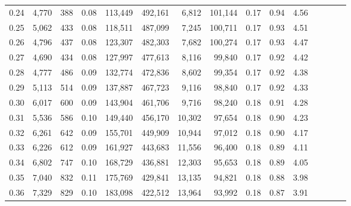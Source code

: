 \begin{tabular}{rrrcrrrrrrrrrrr}
0.24 &   4,770 &    388 &                                       0.08 &  113,449 &  492,161 &    6,812 &  101,144 &  0.17 &  0.94 &                         4.56 \\
0.25 &   5,062 &    433 &                                       0.08 &  118,511 &  487,099 &    7,245 &  100,711 &  0.17 &  0.93 &                         4.51 \\
0.26 &   4,796 &    437 &                                       0.08 &  123,307 &  482,303 &    7,682 &  100,274 &  0.17 &  0.93 &                         4.47 \\
0.27 &   4,690 &    434 &                                       0.08 &  127,997 &  477,613 &    8,116 &   99,840 &  0.17 &  0.92 &                         4.42 \\
0.28 &   4,777 &    486 &                                       0.09 &  132,774 &  472,836 &    8,602 &   99,354 &  0.17 &  0.92 &                         4.38 \\
0.29 &   5,113 &    514 &                                       0.09 &  137,887 &  467,723 &    9,116 &   98,840 &  0.17 &  0.92 &                         4.33 \\
0.30 &   6,017 &    600 &                                       0.09 &  143,904 &  461,706 &    9,716 &   98,240 &  0.18 &  0.91 &                         4.28 \\
0.31 &   5,536 &    586 &                                       0.10 &  149,440 &  456,170 &   10,302 &   97,654 &  0.18 &  0.90 &                         4.23 \\
0.32 &   6,261 &    642 &                                       0.09 &  155,701 &  449,909 &   10,944 &   97,012 &  0.18 &  0.90 &                         4.17 \\
0.33 &   6,226 &    612 &                                       0.09 &  161,927 &  443,683 &   11,556 &   96,400 &  0.18 &  0.89 &                         4.11 \\
0.34 &   6,802 &    747 &                                       0.10 &  168,729 &  436,881 &   12,303 &   95,653 &  0.18 &  0.89 &                         4.05 \\
0.35 &   7,040 &    832 &                                       0.11 &  175,769 &  429,841 &   13,135 &   94,821 &  0.18 &  0.88 &                         3.98 \\
0.36 &   7,329 &    829 &                                       0.10 &  183,098 &  422,512 &   13,964 &   93,992 &  0.18 &  0.87 &                         3.91 \\

\end{tabular}
